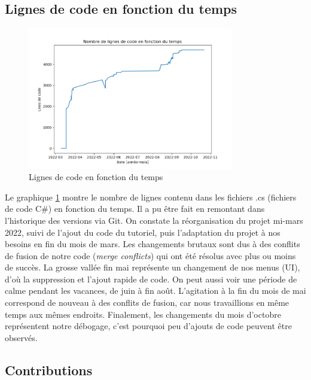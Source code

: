 \documentclass[a4paper]{article}
\begin{document}
\subsection{Lignes de code en fonction du temps}
\begin{figure}[h]
    \centering
    \includegraphics[width=0.8\textwidth]{images/stats/lines_of_code.png}
    \caption{Lignes de code en fonction du temps}
    \label{fig:lines_of_code}
\end{figure}
\noindent Le graphique \ref{fig:lines_of_code} montre le nombre de lignes contenu dans les fichiers .cs (fichiers de code C\#) en fonction du temps. Il a pu être fait en remontant dans l’historique des versions via Git. On constate la réorganisation du projet mi-mars 2022, suivi de l’ajout du code du tutoriel, puis l’adaptation du projet à nos besoins en fin du mois de mars. Les changements brutaux sont dus à des conflits de fusion de notre code (\textit{merge conflicts}) qui ont été résolus avec plus ou moins de succès. La grosse vallée fin mai représente un changement de nos menus (UI), d'où la suppression et l’ajout rapide de code. On peut aussi voir une période de calme pendant les vacances, de juin à fin août. L’agitation à la fin du mois de mai correspond de nouveau à des conflits de fusion, car nous travaillions en même temps aux mêmes endroits. Finalement, les changements du mois d’octobre représentent notre débogage, c’est pourquoi peu d’ajouts de code peuvent être observés.

\newpage
\subsection{Contributions}
\end{document}
